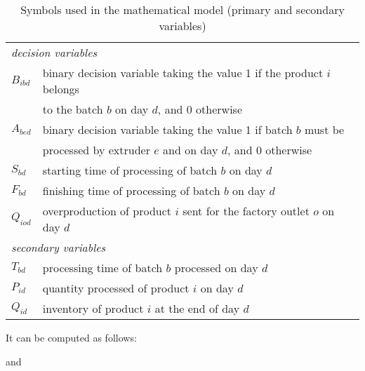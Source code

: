 \begin{table}[h!]
\begin{center}
\footnotesize
	\begin{tabular}{ l l } 

		\multicolumn{2}{l}{\emph{decision variables}} \\ 
		
		$B_{ibd}$ & binary decision variable taking the value 1 if the product $i$ belongs \\
		& to the batch $b$ on day $d$, and 0 otherwise \\
		$A_{bed}$ &  binary decision variable taking the value 1 if batch $b$ must be \\
		&            processed by extruder $e$ and on day $d$, and 0 otherwise \\
       	$S_{bd}$ & starting time of processing of batch $b$ on day $d$ \\
       	$F_{bd}$ & finishing time of processing of batch $b$ on day $d$ \\
       	$Q_{iod}$ & overproduction of product $i$ sent for the factory outlet $o$ on day $d$ \\
       	
       	\multicolumn{2}{l}{\emph{secondary variables}} \\ 
       	
		$T_{bd}$ & processing time of batch $b$ processed on day $d$ \\
		$P_{id}$ & quantity processed of product $i$ on day $d$ \\
		$Q_{id}$ & inventory of product $i$ at the end of day $d$ \\ 
	\end{tabular}
\caption{Symbols used in the mathematical model (primary and secondary variables)}
\label{tab:symbols}
\end{center}
\end{table}

It can be computed
as follows:

and \cite{RefJ}
